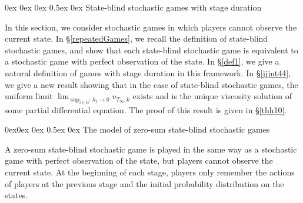 \documentclass[english,openary,12pt]{article}
\makeatletter
\renewcommand\section{\@startsection {section}{1}{\z@}%
                                   {0ex \@plus 0ex \@minus 0ex}%
                                   {0.5ex \@plus0ex}%
                                   {\normalfont\LARGE\bfseries}}%
\renewcommand\subsection{\@startsection{subsection}{2}{\z@}%
                                     {0ex\@plus 0ex \@minus 0ex}%
                                     {0.5ex \@plus 0ex}%
                                     {\normalfont\Large\bfseries}}%
\theoremstyle{definition}
\newtheorem{remark}{Remark}
\newcommand{\N}{\mathbb{N}}
\makeatother
\begin{document}




\section{State-blind stochastic games with stage duration}
\label{repeatedGames234}

In this section, we consider stochastic games in which players cannot observe the current state. In \S\ref{repeatedGames}, we recall the definition of state-blind stochastic games, and show that each state-blind stochastic game is equivalent to a stochastic game with perfect observation of the state. In \S\ref{def1}, we give a natural definition of games with stage duration in this framework. In \S\ref{jjjnt44}, we give a new result showing that in the case of state-blind stochastic games, the uniform limit $\lim_{\sup_{i\in\N^*} h_i \to 0} v_{T_\infty,k}$ exists and is the unique viscosity solution of some partial differential equation. The proof of this result is given in \S\ref{thh10}.

\subsection{The model of zero-sum state-blind stochastic games}
\label{repeatedGames}

A zero-sum state-blind stochastic game is played in the same way as a  
stochastic game with perfect observation of the state, but players 
cannot observe the current state. At the beginning of each stage, players
only remember the actions of players at the previous stage and 
the initial probability distribution on the states.
\end{document}
